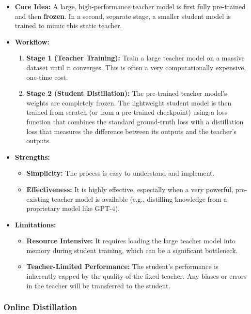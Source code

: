 \begin{itemize}
    \item \textbf{Core Idea:} A large, high-performance teacher model is first fully pre-trained and then \textbf{frozen}. In a second, separate stage, a smaller student model is trained to mimic this static teacher.
    \item \textbf{Workflow:}
        \begin{enumerate}
            \item \textbf{Stage 1 (Teacher Training):} Train a large teacher model on a massive dataset until it converges. This is often a very computationally expensive, one-time cost.
            \item \textbf{Stage 2 (Student Distillation):} The pre-trained teacher model's weights are completely frozen. The lightweight student model is then trained from scratch (or from a pre-trained checkpoint) using a loss function that combines the standard ground-truth loss with a distillation loss that measures the difference between its outputs and the teacher's outputs.
        \end{enumerate}
    \item \textbf{Strengths:}
        \begin{itemize}
            \item \textbf{Simplicity:} The process is easy to understand and implement.
            \item \textbf{Effectiveness:} It is highly effective, especially when a very powerful, pre-existing teacher model is available (e.g., distilling knowledge from a proprietary model like GPT-4).
        \end{itemize}
    \item \textbf{Limitations:}
        \begin{itemize}
            \item \textbf{Resource Intensive:} It requires loading the large teacher model into memory during student training, which can be a significant bottleneck.
            \item \textbf{Teacher-Limited Performance:} The student's performance is inherently capped by the quality of the fixed teacher. Any biases or errors in the teacher will be transferred to the student.
        \end{itemize}
\end{itemize}

\subsubsection{Online Distillation}
\label{ssec:online_distillation}


